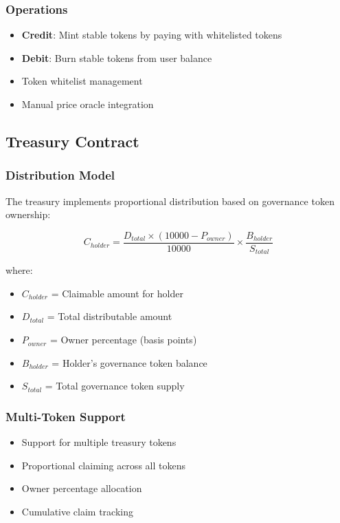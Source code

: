 \documentclass[11pt,a4paper]{article}
\begin{document}
\subsubsection{Operations}
\begin{itemize}
\item \textbf{Credit}: Mint stable tokens by paying with whitelisted tokens
\item \textbf{Debit}: Burn stable tokens from user balance
\item Token whitelist management
\item Manual price oracle integration
\end{itemize}

\subsection{Treasury Contract}

\subsubsection{Distribution Model}

The treasury implements proportional distribution based on governance token ownership:

\begin{equation}
C_{holder} = \frac{D_{total} \times (10000 - P_{owner})}{10000} \times \frac{B_{holder}}{S_{total}}
\end{equation}

where:
\begin{itemize}
\item $C_{holder}$ = Claimable amount for holder
\item $D_{total}$ = Total distributable amount
\item $P_{owner}$ = Owner percentage (basis points)
\item $B_{holder}$ = Holder's governance token balance
\item $S_{total}$ = Total governance token supply
\end{itemize}

\subsubsection{Multi-Token Support}
\begin{itemize}
\item Support for multiple treasury tokens
\item Proportional claiming across all tokens
\item Owner percentage allocation
\item Cumulative claim tracking
\end{itemize}
\end{document}
